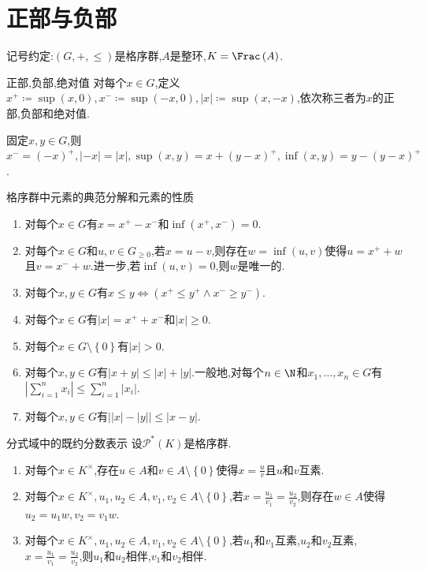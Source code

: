 \section{正部与负部}

记号约定:$\left(G,+,\leq\right)$是格序群,$A$是整环,$K=\Frac\left(A\right)$.

\begin{definition}{正部,负部,绝对值}{}
	对每个$x\in G$,定义$x^{+}\coloneq\sup\left(x,0\right),x^{-}\coloneq\sup\left(-x,0\right),\left|x\right|\coloneq\sup\left(x,-x\right)$,依次称三者为$x$的正部,负部和绝对值.
\end{definition}

\begin{remark}{}{}
	固定$x,y\in G$,则$x^{-}=\left(-x\right)^{+},\left|-x\right|=\left|x\right|,\sup\left(x,y\right)=x+\left(y-x\right)^{+},\inf\left(x,y\right)=y-\left(y-x\right)^{+}$.
\end{remark}

\begin{proposition}{格序群中元素的典范分解和元素的性质}{}
	\begin{enumerate}
		\item 对每个$x\in G$有$x=x^{+}-x^{-}$和$\inf\left(x^{+},x^{-}\right)=0$.
		\item 对每个$x\in G$和$u,v\in G_{\geq 0}$,若$x=u-v$,则存在$w=\inf\left(u,v\right)$使得$u=x^{+}+w$且$v=x^{-}+w$.进一步,若$\inf\left(u,v\right)=0$,则$w$是唯一的.
		\item 对每个$x,y\in G$有$x\leq y\iff\left(x^{+}\leq y^{+}\wedge x^{-}\geq y^{-}\right)$.
		\item 对每个$x\in G$有$\left|x\right|=x^{+}+x^{-}$和$\left|x\right|\geq 0$.
		\item 对每个$x\in G\setminus\left\{0\right\}$有$\left|x\right|>0$.
		\item 对每个$x,y\in G$有$\left|x+y\right|\leq\left|x\right|+\left|y\right|$.一般地,对每个$n\in\N$和$x_{1},\ldots,x_{n}\in G$有$\left|\sum\limits_{i=1}^{n}x_{i}\right|\leq\sum\limits_{i=1}^{n}\left|x_{i}\right|$.
		\item 对每个$x,y\in G$有$\left|\left|x\right|-\left|y\right|\right|\leq\left|x-y\right|$.
	\end{enumerate}
\end{proposition}

\begin{proposition}{分式域中的既约分数表示}{}
	设$\mathscr{P}^{\ast}\left(K\right)$是格序群.
	\begin{enumerate}
		\item 对每个$x\in K^{\times}$,存在$u\in A$和$v\in A\setminus\left\{0\right\}$使得$x=\frac{u}{v}$且$u$和$v$互素.
		\item 对每个$x\in K^{\times},u_{1},u_{2}\in A,v_{1},v_{2}\in A\setminus\left\{0\right\}$,若$x=\frac{u_{1}}{v_{1}}=\frac{
		u_{2}}{v_{2}}$,则存在$w\in A$使得$u_{2}=u_{1}w,v_{2}=v_{1}w$.
		\item 对每个$x\in K^{\times},u_{1},u_{2}\in A,v_{1},v_{2}\in A\setminus\left\{0\right\}$,若$u_{1}$和$v_{1}$互素,$u_{2}$和$v_{2}$互素,$x=\frac{u_{1}}{v_{1}}=\frac{u_{2}}{v_{2}}$,则$u_{1}$和$u_{2}$相伴,$v_{1}$和$v_{2}$相伴.
	\end{enumerate}
\end{proposition}


